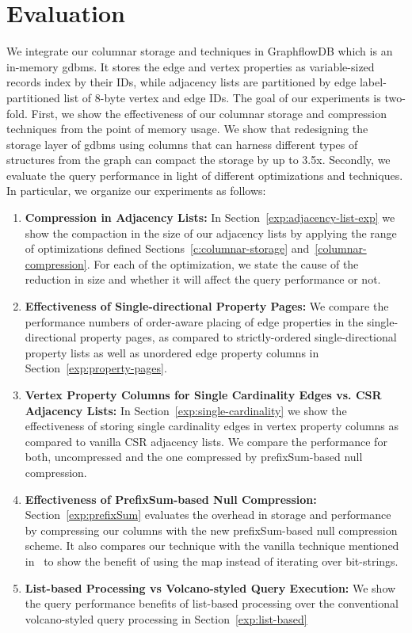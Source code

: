 \chapter{Evaluation}
\label{c:evaluation}

We integrate our columnar storage and techniques in GraphflowDB which is an in-memory \gls{gdbms}. It stores the edge and vertex properties as variable-sized records index by their IDs, while adjacency lists are partitioned by edge label-partitioned list of 8-byte vertex and edge IDs. The goal of our experiments is two-fold. First, we show the effectiveness of our columnar storage and compression techniques from the point of memory usage. We show that redesigning the storage layer of \gls{gdbms} using columns that can harness different types of structures from the graph can compact the storage by up to 3.5x. Secondly, we evaluate the query performance in light of different optimizations and techniques. In particular, we organize our experiments as follows:

\begin{enumerate}
	\item \textbf{Compression in Adjacency Lists:}  In Section~\ref{exp:adjacency-list-exp} we show the compaction in the size of our adjacency lists by applying the range of optimizations defined Sections~\ref{c:columnar-storage} and~\ref{columnar-compression}. For each of the optimization, we state the cause of the reduction in size and whether it will affect the query performance or not.
	
	\item \textbf{Effectiveness of Single-directional Property Pages:} We compare the performance numbers of order-aware placing of edge properties in the single-directional property pages, as compared to strictly-ordered single-directional property lists as well as unordered edge property columns in Section~\ref{exp:property-pages}.
	
	\item \textbf{Vertex Property Columns for Single Cardinality Edges vs. CSR Adjacency Lists:}  In Section~\ref{exp:single-cardinality} we show the effectiveness of storing single cardinality edges in vertex property columns as compared to vanilla CSR adjacency lists. We compare the performance for both, uncompressed and the one compressed by prefixSum-based null compression.
	
	\item \textbf{Effectiveness of PrefixSum-based Null Compression:}  Section~\ref{exp:prefixSum} evaluates the overhead in storage and performance by compressing our columns with the new prefixSum-based null compression scheme. It also compares our technique with the vanilla technique mentioned in~\cite{abadi-sparse-col} to show the benefit of using the map instead of iterating over bit-strings.
	
	\item \textbf{List-based Processing vs Volcano-styled Query Execution:} We show the query performance benefits of list-based processing over the conventional volcano-styled query processing in Section~\ref{exp:list-based}
	
\end{enumerate}

